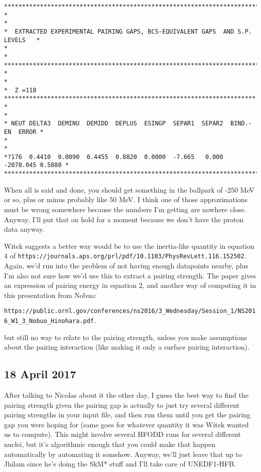 \documentclass[]{report}
\begin{document}
\begin{verbatim}
********************************************************************************
*                                                                              *
*  EXTRACTED EXPERIMENTAL PAIRING GAPS, BCS-EQUIVALENT GAPS  AND S.P. LEVELS   *
*                                                                              *
********************************************************************************
*                                                                              *
*  Z =118 **********************************************************************
*                                                                              *
* NEUT DELTA3  DEMINU  DEMIDD  DEPLUS  ESINGP  SEPAR1  SEPAR2  BIND.-EN  ERROR *
*                                                                              *
*?176  0.4410  0.0090  0.4455  0.8820  0.0000  -7.665   0.000 -2078.045 0.5880 *
********************************************************************************
\end{verbatim}

\noindent When all is said and done, you should get something in the ballpark of -250 MeV or so, plus or minus probably like 50 MeV. I think one of those approximations must be wrong somewhere because the numbers I'm getting are nowhere close. Anyway, I'll put that on hold for a moment because we don't have the proton data anyway.

Witek suggests a better way would be to use the inertia-like quantity in equation 4 of \verb|https://journals.aps.org/prl/pdf/10.1103/PhysRevLett.116.152502|. Again, we'd run into the problem of not having enough datapoints nearby, plus I'm also not sure how we'd use this to extract a pairing strength. The paper gives an expression of pairing energy in equation 2, and another way of computing it in this presentation from Nobuo:

\noindent\verb|https://public.ornl.gov/conferences/ns2016/3_Wednesday/Session_1/NS2016_W1_3_Nobuo_Hinohara.pdf|.

\noindent but still no way to relate to the pairing strength, unless you make assumptions about the pairing interaction (like making it only a surface pairing interaction).

\subsection*{18 April 2017}
After talking to Nicolas about it the other day, I guess the best way to find the pairing strength given the pairing gap is actually to just try several different pairing strengths in your input file, and then run them until you get the pairing gap you were hoping for (same goes for whatever quantity it was Witek wanted us to compute). This might involve several HFODD runs for several different nuclei, but it's algorithmic enough that you could make that happen automatically by automating it somehow. Anyway, we'll just leave that up to Jhilam since he's doing the SkM* stuff and I'll take care of UNEDF1-HFB.
\end{document}

